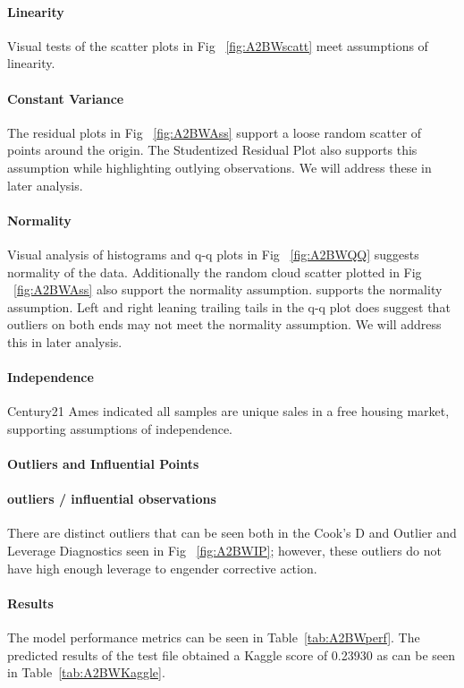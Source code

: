 \documentclass[11pt]{scrartcl} %
\begin{document}
\paragraph{Linearity} Visual tests of the scatter plots in Fig ~\ref{fig:A2BWscatt} meet assumptions of linearity.
\paragraph{Constant Variance} The residual plots in Fig ~\ref{fig:A2BWAss} support a loose random scatter of points around the origin. The Studentized Residual Plot also supports this assumption while highlighting outlying observations. We will address these in later analysis.
\paragraph{Normality} Visual analysis of histograms and q-q plots in Fig ~\ref{fig:A2BWQQ} suggests normality of the data. Additionally the random cloud scatter plotted in Fig ~\ref{fig:A2BWAss} also support the normality assumption. supports the normality assumption. Left and right leaning trailing tails in the q-q plot does suggest that outliers on both ends may not meet the normality assumption. We will address this in later analysis.
\paragraph{Independence} Century21 Ames indicated all samples are unique sales in a free housing market, supporting assumptions of independence. 
\paragraph{Outliers and Influential Points}
\paragraph{outliers / influential observations} There are distinct outliers that can be seen both in the Cook's D and Outlier and Leverage Diagnostics seen in Fig ~\ref{fig:A2BWIP}; however, these outliers do not have high enough leverage to engender corrective action.
\paragraph{Results} The model performance metrics can be seen in Table~\ref{tab:A2BWperf}. The predicted results of the test file obtained a Kaggle score of 0.23930 as can be seen in Table~\ref{tab:A2BWKaggle}.
\end{document}
